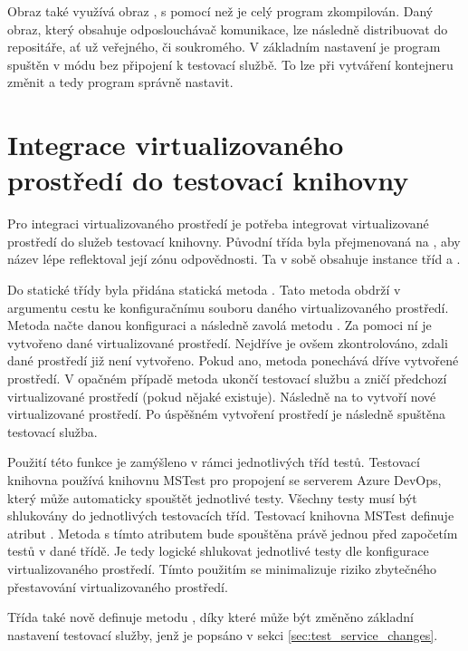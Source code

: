 Obraz také využívá obraz , s pomocí než je celý program zkompilován. Daný obraz, který obsahuje odposlouchávač komunikace, lze následně distribuovat do repositáře, ať už veřejného, či soukromého. V základním nastavení je program spuštěn v módu bez připojení k testovací službě. To lze při vytváření kontejneru změnit a tedy program správně nastavit. 

\section{Integrace virtualizovaného prostředí do testovací knihovny}

Pro integraci virtualizovaného prostředí je potřeba integrovat virtualizované prostředí do služeb testovací knihovny. Původní třída  byla přejmenovaná na , aby název lépe reflektoval její zónu odpovědnosti. Ta v sobě obsahuje instance tříd  a .

Do statické třídy  byla přidána statická metoda . Tato metoda obdrží v argumentu cestu ke konfiguračnímu souboru daného virtualizovaného prostředí. Metoda načte danou konfiguraci a následně zavolá metodu . Za pomoci ní je vytvořeno dané virtualizované prostředí. Nejdříve je ovšem zkontrolováno, zdali dané prostředí již není vytvořeno. Pokud ano, metoda ponechává dříve vytvořené prostředí. V opačném případě metoda ukončí testovací službu a zničí předchozí virtualizované prostředí (pokud nějaké existuje). Následně na to vytvoří nové virtualizované prostředí. Po úspěšném vytvoření prostředí je následně spuštěna testovací služba.

Použití této funkce je zamýšleno v rámci jednotlivých tříd testů. Testovací knihovna používá knihovnu MSTest pro propojení se serverem Azure DevOps, který může automaticky spouštět jednotlivé testy. Všechny testy musí být shlukovány do jednotlivých testovacích tříd. Testovací knihovna MSTest definuje atribut . Metoda s tímto atributem bude spouštěna právě jednou před započetím testů v dané třídě. Je tedy logické shlukovat jednotlivé testy dle konfigurace virtualizovaného prostředí. Tímto použitím se minimalizuje riziko zbytečného přestavování virtualizovaného prostředí. 

Třída  také nově definuje metodu , díky které může být změněno základní nastavení testovací služby, jenž je popsáno v sekci \ref{sec:test_service_changes}.


